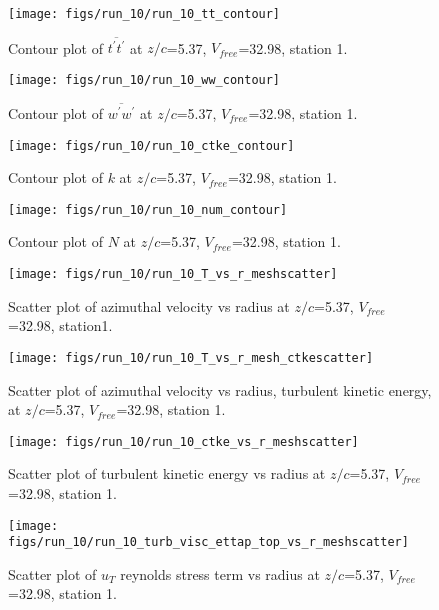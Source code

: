 \begin{figure}[H]
\centering
\texttt{[image: figs/run\_10/run\_10\_tt\_contour]}
\caption{Contour plot of $\overline{t^\prime t^\prime}$ at $z/c$=5.37, $V_{free}$=32.98, station 1.}
\end{figure}


\begin{figure}[H]
\centering
\texttt{[image: figs/run\_10/run\_10\_ww\_contour]}
\caption{Contour plot of $\overline{w^\prime w^\prime}$ at $z/c$=5.37, $V_{free}$=32.98, station 1.}
\end{figure}


\begin{figure}[H]
\centering
\texttt{[image: figs/run\_10/run\_10\_ctke\_contour]}
\caption{Contour plot of $k$ at $z/c$=5.37, $V_{free}$=32.98, station 1.}
\end{figure}


\begin{figure}[H]
\centering
\texttt{[image: figs/run\_10/run\_10\_num\_contour]}
\caption{Contour plot of $N$ at $z/c$=5.37, $V_{free}$=32.98, station 1.}
\end{figure}


\begin{figure}[H]
\centering
\texttt{[image: figs/run\_10/run\_10\_T\_vs\_r\_meshscatter]}
\caption{Scatter plot of azimuthal velocity vs radius at $z/c$=5.37, $V_{free}$=32.98, station1.}
\end{figure}


\begin{figure}[H]
\centering
\texttt{[image: figs/run\_10/run\_10\_T\_vs\_r\_mesh\_ctkescatter]}
\caption{Scatter plot of azimuthal velocity vs radius, turbulent kinetic energy, at $z/c$=5.37, $V_{free}$=32.98, station 1.}
\end{figure}


\begin{figure}[H]
\centering
\texttt{[image: figs/run\_10/run\_10\_ctke\_vs\_r\_meshscatter]}
\caption{Scatter plot of turbulent kinetic energy vs radius at $z/c$=5.37, $V_{free}$=32.98, station 1.}
\end{figure}


\begin{figure}[H]
\centering
\texttt{[image: figs/run\_10/run\_10\_turb\_visc\_ettap\_top\_vs\_r\_meshscatter]}
\caption{Scatter plot of $
u_T$ reynolds stress term vs radius at $z/c$=5.37, $V_{free}$=32.98, station 1.}
\end{figure}


